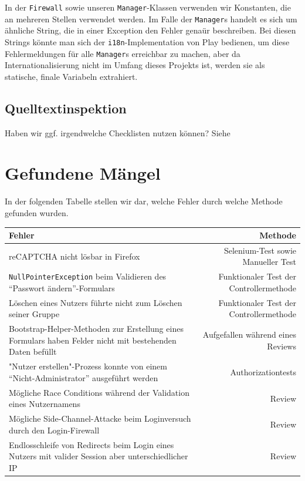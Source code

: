 \documentclass[12pt,DIV14,BCOR10mm,a4paper,twoside,parskip=half-,headsepline,headinclude,english,ngerman,bibliography=totocnumbered]{scrreprt}
\begin{document}
In der \texttt{Firewall} sowie unseren \texttt{Manager}-Klassen verwenden wir Konstanten, die an mehreren Stellen verwendet werden.
Im Falle der \texttt{Manager}s handelt es sich um ähnliche String, die in einer Exception den Fehler genaür beschreiben.
Bei diesen Strings könnte man sich der \texttt{i18n}-Implementation von Play bedienen, um diese Fehlermeldungen für alle \texttt{Manager}s erreichbar zu machen, aber da Internationalisierung nicht im Umfang dieses Projekts ist, werden sie als statische, finale Variabeln extrahiert.

\section{Quelltextinspektion}

Haben wir ggf. irgendwelche Checklisten nutzen können?
Siehe

\chapter{Gefundene Mängel}

In der folgenden Tabelle stellen wir dar, welche Fehler durch welche Methode gefunden wurden.

\begin{table}[ht]
   \label{tab:title}
  \begin{tabularx}{\textwidth}{| X | r |}
  \hline
  \textbf{Fehler} & \textbf{Methode} \\ \hline
  reCAPTCHA nicht lösbar in Firefox & Selenium-Test sowie Manueller Test \\ \hline
  \texttt{NullPointerException} beim Validieren des \enquote{Passwort ändern}-Formulars & Funktionaler Test der Controllermethode \\ \hline
  Löschen eines Nutzers führte nicht zum Löschen seiner Gruppe & Funktionaler Test der Controllermethode \\ \hline
  Bootstrap-Helper-Methoden zur Erstellung eines Formulars haben Felder nicht mit bestehenden Daten befüllt & Aufgefallen während eines Reviews \\ \hline
  "Nutzer erstellen"-Prozess konnte von einem \enquote{Nicht-Administrator} ausgeführt werden & Authorizationtests \\ \hline
  Mögliche Race Conditions während der Validation eines Nutzernamens & Review \\ \hline
  Mögliche Side-Channel-Attacke beim Loginversuch durch den Login-Firewall & Review \\ \hline
  Endlosschleife von Redirects beim Login eines Nutzers mit valider Session aber unterschiedlicher IP & Review \\ \hline

  \end{tabularx}
\end{table}
\end{document}
